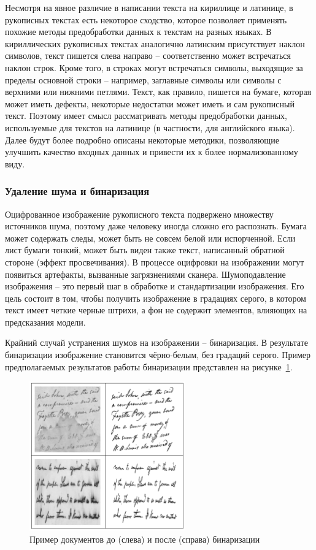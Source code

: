 Несмотря на явное различие в написании текста на кириллице и латинице, в рукописных текстах есть некоторое сходство,
которое позволяет применять похожие методы предобработки данных к текстам на разных языках.
В кириллических рукописных текстах аналогично латинским присутствует наклон символов,
текст пишется слева направо -- соответственно может встречаться наклон строк.
Кроме того, в строках могут встречаться символы, выходящие за пределы основной строки --
например, заглавные символы или символы с верхними или нижними петлями.
Текст, как правило, пишется на бумаге, которая может иметь дефекты, некоторые недостатки может иметь и сам рукописный текст.
Поэтому имеет смысл рассматривать методы предобработки данных, используемые для текстов на латинице (в частности, для английского языка).
Далее будут более подробно описаны некоторые методики, позволяющие улучшить качество входных данных и привести их к более нормализованному виду.

\subsubsection{Удаление шума и бинаризация}
\label{subsubsec:binarization}

Оцифрованное изображение рукописного текста подвержено множеству источников шума, поэтому даже человеку иногда сложно его распознать.
Бумага может содержать следы, может быть не совсем белой или испорченной.
Если лист бумаги тонкий, может быть виден также текст, написанный обратной стороне (эффект просвечивания).
В процессе оцифровки на изображении могут появиться артефакты, вызванные загрязнениями сканера.
Шумоподавление изображения -- это первый шаг в обработке и стандартизации изображения.
Его цель состоит в том, чтобы получить изображение в градациях серого, в котором текст имеет четкие черные штрихи,
а фон не содержит элементов, влияющих на предсказания модели.

Крайний случай устранения шумов на изображении -- бинаризация.
В результате бинаризации изображение становится чёрно-белым, без градаций серого.
Пример предполагаемых результатов работы бинаризации представлен на рисунке~\ref{fig:binarization}.
\begin{figure}[h!]
    \centering
    \includegraphics[width=0.6\textwidth]{img/binarization}
    \caption{Пример документов до (слева) и после (справа) бинаризации}
    \label{fig:binarization}
\end{figure}

